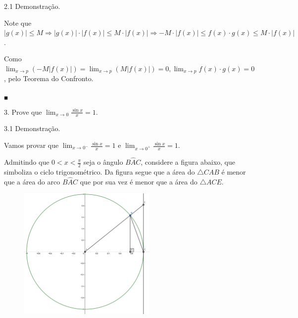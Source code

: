 \documentclass{article}
\begin{document}
{\begin{newpage}
\begin{flushleft}
\end{flushleft}
\par
\vspace{0.3cm}
\begin{flushleft}
2.1 Demonstração.
\end{flushleft}
\par
Note que $|g(x)|\leq M \Rightarrow |g(x)|\cdot |f(x)|\leq M\cdot|f(x)|\Rightarrow -M\cdot|f(x)|\leq f(x)\cdot g(x)\leq M\cdot|f(x)|$.
\vspace{0.2cm}
\par Como $\displaystyle{\lim_{x\to p} (-M|f(x)| ) = \lim_{x\to p} (M |f(x)| ) = 0, \lim_{x\to p}} f(x)\cdot g(x) = 0$, pelo Teorema do Confronto.
\begin{flushright} $_{\blacksquare }$ \end{flushright}
\par
\vspace{0.3cm}
\begin{flushleft}
3. Prove que $\displaystyle{\lim_{x\to 0}} \frac{\sin{x}}{x} = 1$.
\end{flushleft}
\vspace{0.3cm}
\begin{flushleft}
3.1 Demonstração.
\end{flushleft}
\par
Vamos provar que $\displaystyle{\lim_{x\to 0^{-}}} \frac{\sin{x}}{x} = 1$ e $\displaystyle{\lim_{x\to 0^{+}}} \frac{\sin{x}}{x} = 1$.
\vspace{0.3cm}
\par
Admitindo que $0<x<\displaystyle{\frac{\pi }{2}}$ seja o ângulo $B\hat{A}C$, considere a figura abaixo, que simboliza o ciclo trigonométrico. Da figura segue que a área do $\triangle CAB$ é menor que a área do arco $B\hat{A}C$ que por sua vez é menor que a área do $\triangle ACE$.
\begin{figure}[htbp]
\begin{center}
\includegraphics[width=0.6\textwidth, angle=0]{Circulo.png}

\end{center}
\end{figure}
\end{newpage}}
\end{document}
